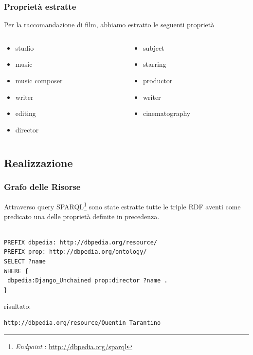 \documentclass{beamer}
\begin{document}

\begin{frame}
\frametitle{Proprietà estratte}
Per la raccomandazione di film, abbiamo estratto le seguenti proprietà
\begin{columns}
\begin{column}{0.5\textwidth}
\begin{itemize}
\item studio
\item music
\item music composer
\item writer
\item editing
\item director
\end{itemize}
\end{column}
\begin{column}{0.5\textwidth}
\begin{itemize}
\item subject
\item starring
\item productor
\item writer
\item cinematography
\end{itemize}
\end{column}
\end{columns}
\end{frame}


\subsection{Realizzazione}


\begin{frame}[fragile]
\frametitle{Grafo delle Risorse}
Attraverso query SPARQL\footnote{\emph{Endpoint} : \url{http://dbpedia.org/sparql}} sono state estratte tutte le triple RDF aventi come predicato una delle proprietà definite in precedenza. \\~\\
\begin{lstlisting}[language=customized]
PREFIX dbpedia: http://dbpedia.org/resource/
PREFIX prop: http://dbpedia.org/ontology/
SELECT ?name
WHERE {
 dbpedia:Django_Unchained prop:director ?name .
}
\end{lstlisting}
risultato:

\begin{lstlisting}[language=customized]
http://dbpedia.org/resource/Quentin_Tarantino
\end{lstlisting}
\end{frame}
\end{document}

